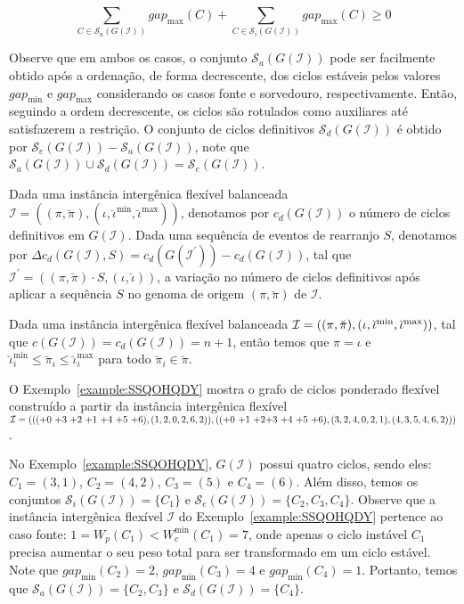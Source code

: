 $$\sum_{C \in \mathcal{S}_a(G(\mathcal{I}))} gap_{\max}(C) + \sum_{C \in \mathcal{S}_i(G(\mathcal{I}))} gap_{\max}(C) \ge 0$$

Observe que em ambos os casos, o conjunto $\mathcal{S}_a(G(\mathcal{I}))$ pode ser facilmente obtido após a ordenação, de forma decrescente, dos ciclos estáveis pelos valores $gap_{\min}$ e $gap_{\max}$ considerando os casos fonte e sorvedouro, respectivamente. Então, seguindo a ordem decrescente, os ciclos são rotulados como auxiliares até satisfazerem a restrição. O conjunto de ciclos definitivos $\mathcal{S}_d(G(\mathcal{I}))$ é obtido por $\mathcal{S}_e(G(\mathcal{I})) - \mathcal{S}_a(G(\mathcal{I}))$, note que $\mathcal{S}_a(G(\mathcal{I})) \cup \mathcal{S}_d(G(\mathcal{I})) = \mathcal{S}_e(G(\mathcal{I}))$.

Dada uma instância intergênica flexível balanceada $\mathcal{I} = ((\pi,\breve\pi),(\iota,\breve\iota^{\min},\breve\iota^{\max}))$, denotamos por $c_d(G(\mathcal{I}))$ o número de ciclos definitivos em $G(\mathcal{I})$. Dada uma sequência de eventos de rearranjo $S$, denotamos por $\Delta c_d(G(\mathcal{I}), S) = c_d(G(\mathcal{I^{\prime}})) - c_d(G(\mathcal{I}))$, tal que $\mathcal{I^{\prime}} = ((\pi,\breve\pi) \cdot S,(\iota,\breve\iota))$, a variação no número de ciclos definitivos após aplicar a sequência $S$ no genoma de origem $(\pi,\breve\pi)$ de $\mathcal{I}$.

\begin{remark}\label{remark:HLVDQLCE}
Dada uma instância intergênica flexível balanceada $\mathcal{I} = ((\pi,\breve\pi),(\iota,\breve\iota^{\min},\break\breve\iota^{\max}))$, tal que $c(G(\mathcal{I})) = c_d(G(\mathcal{I})) = n+1$, então temos que $\pi = \iota$ e $\breve\iota^{\min}_i \le \breve\pi_i \le \breve\iota^{\max}_i$ para todo $\breve\pi_i \in \breve\pi$.
\end{remark}

O Exemplo~\ref{example:SSQOHQDY} mostra o grafo de ciclos ponderado flexível construído a partir da instância intergênica flexível $\mathcal{I} = ((({+0}~{+3}~{+2}~{+1}~{+4}~{+5}~{+6}),(1,2,0,2,6,2)),(({+0}~{+1}~{+2}\break{+3}~{+4}~{+5}~{+6}),(3,2,4,0,2,1),(4,3,5,4,6,2)))$.



No Exemplo~\ref{example:SSQOHQDY}, $G(\mathcal{I})$ possui quatro ciclos, sendo eles: $C_1 = (3,1)$, $C_2 = (4,2)$, $C_3 = (5)$ e $C_4=(6)$. Além disso, temos os conjuntos $\mathcal{S}_i(G(\mathcal{I})) = \{C_1\}$ e $\mathcal{S}_e(G(\mathcal{I})) = \{C_2,C_3,C_4\}$. Observe que a instância intergênica flexível $\mathcal{I}$ do Exemplo~\ref{example:SSQOHQDY} pertence ao caso fonte: $1 = W_p(C_1) < W^{\min}_c(C_1) = 7$, onde apenas o ciclo instável $C_1$ precisa aumentar o seu peso total para ser transformado em um ciclo estável. Note que $gap_{\min}(C_2) = 2$, $gap_{\min}(C_3) = 4$ e $gap_{\min}(C_4) = 1$. Portanto, temos que $\mathcal{S}_a(G(\mathcal{I})) = \{C_2, C_3\}$ e $\mathcal{S}_d(G(\mathcal{I})) = \{C_4\}$.

